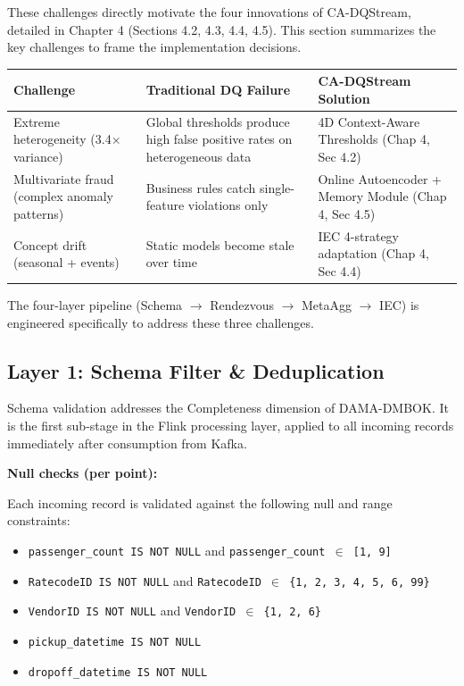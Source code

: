 These challenges directly motivate the four innovations of CA-DQStream, detailed in Chapter 4 (Sections 4.2, 4.3, 4.4, 4.5). This section summarizes the key challenges to frame the implementation decisions.

\begin{center}
\begin{tabular}{|m{5cm}|m{5cm}|m{4cm}|}
\hline
\textbf{Challenge} & \textbf{Traditional DQ Failure} & \textbf{CA-DQStream Solution} \\
\hline
Extreme heterogeneity (3.4$\times$ variance) & Global thresholds produce high false positive rates on heterogeneous data & 4D Context-Aware Thresholds (Chap 4, Sec 4.2) \\
\hline
Multivariate fraud (complex anomaly patterns) & Business rules catch single-feature violations only & Online Autoencoder + Memory Module (Chap 4, Sec 4.5) \\
\hline
Concept drift (seasonal + events) & Static models become stale over time & IEC 4-strategy adaptation (Chap 4, Sec 4.4) \\
\hline
\end{tabular}
\end{center}

The four-layer pipeline (Schema $\rightarrow$ Rendezvous $\rightarrow$ MetaAgg $\rightarrow$ IEC) is engineered specifically to address these three challenges.

\subsection{Layer 1: Schema Filter \& Deduplication}

Schema validation addresses the Completeness dimension of DAMA-DMBOK. It is the first sub-stage in the Flink processing layer, applied to all incoming records immediately after consumption from Kafka.

\textbf{Null checks (per point):}

Each incoming record is validated against the following null and range constraints:

\begin{itemize}
    \item \texttt{passenger\_count IS NOT NULL} and \texttt{passenger\_count $\in$ [1, 9]}
    \item \texttt{RatecodeID IS NOT NULL} and \texttt{RatecodeID $\in$ \{1, 2, 3, 4, 5, 6, 99\}}
    \item \texttt{VendorID IS NOT NULL} and \texttt{VendorID $\in$ \{1, 2, 6\}}
    \item \texttt{pickup\_datetime IS NOT NULL}
    \item \texttt{dropoff\_datetime IS NOT NULL}
\end{itemize}

